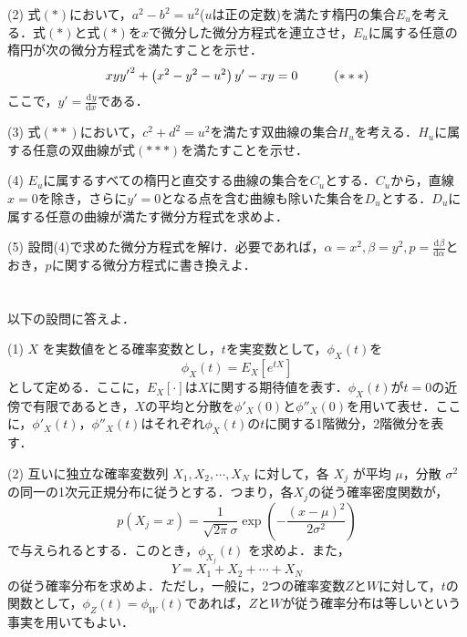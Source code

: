 \documentclass[a4j]{jarticle}
\let \ds \displaystyle
\newcommand{\diff}[3]{
  \frac{\mathrm{d}^{#1} #2}{\mathrm{d} #3^{#1}}
}
\begin{document}
\begin{screen}
 (2) 式$(\ast)$において，$a^2-b^2=u^2$($u$は正の定数)を満たす楕円の集合$E_u$を考える．式$(\ast)$と式$(\ast)$を$x$で微分した微分方程式を連立させ，$E_u$に属する任意の楕円が次の微分方程式を満たすことを示せ．
 \begin{align*}
  xy{y'}^2 + \left(x^2-y^2-u^2\right)y' - xy = 0 \hspace{10mm} (\ast\ast\ast)
 \end{align*}
 ここで，$\ds y' = \diff{}{y}{x}$である．
\end{screen}

\begin{screen}
 (3) 式$(\ast\ast)$において，$c^2+d^2=u^2$を満たす双曲線の集合$H_u$を考える．$H_u$に属する任意の双曲線が式$(\ast\ast\ast)$を満たすことを示せ．
\end{screen}

\begin{screen}
 (4) $E_u$に属するすべての楕円と直交する曲線の集合を$C_u$とする．$C_u$から，直線$x=0$を除き，さらに$y'=0$となる点を含む曲線も除いた集合を$D_u$とする．$D_u$に属する任意の曲線が満たす微分方程式を求めよ．
\end{screen}

\begin{screen}
 (5) 設問(4)で求めた微分方程式を解け．必要であれば，$\ds \alpha=x^2, \beta=y^2, p=\diff{}{\beta}{\alpha}$とおき，$p$に関する微分方程式に書き換えよ．
\end{screen}

\section{}

\begin{screen}
 以下の設問に答えよ．
\end{screen}

\begin{screen}
 (1) $X$ を実数値をとる確率変数とし，$t$を実変数として，$\phi_X(t)$を
 $$\phi_X(t) = E_X\left[e^{tX}\right]$$
 として定める．ここに，$E_X\left[\cdot\right]$は$X$に関する期待値を表す．$\phi_X(t)$が$t=0$の近傍で有限であるとき，$X$の平均と分散を$\phi'_X(0)$と$\phi''_X(0)$を用いて表せ．ここに，$\phi'_X(t)$，$\phi''_X(t)$はそれぞれ$\phi_X(t)$の$t$に関する1階微分，2階微分を表す．
\end{screen}

\begin{screen}
 (2) 互いに独立な確率変数列 $X_1,X_2,\cdots,X_N$ に対して，各 $X_j$ が平均 $\mu$，分散 $\sigma^2$ の同一の1次元正規分布に従うとする．つまり，各$X_j$の従う確率密度関数が，
 $$p(X_j=x) = \frac{1}{\sqrt{2 \pi}\sigma}\exp\left(- \frac{(x-\mu)^2}{2\sigma^2}\right)$$
 で与えられるとする．このとき，$\phi_{X_j}(t)$ を求めよ．また，
 $$ Y = X_1 + X_2 + \cdots + X_N$$
 の従う確率分布を求めよ．ただし，一般に，2つの確率変数$Z$と$W$に対して，$t$の関数として，$\phi_Z(t)=\phi_W(t)$であれば，$Z$と$W$が従う確率分布は等しいという事実を用いてもよい．
\end{screen}
\end{document}
